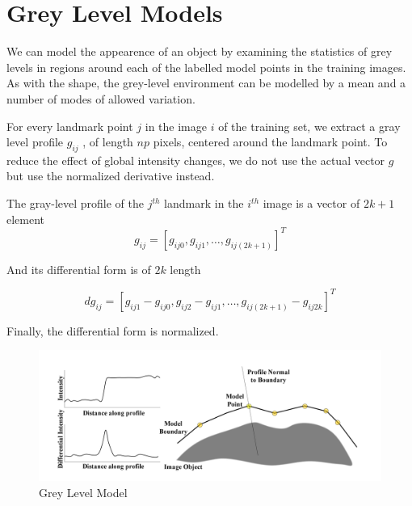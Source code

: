 \section{Grey Level Models}
We can model the appearence of an object by examining
the statistics of grey levels in regions around each
of the labelled model points in the training images.
As with the shape, the grey-level environment can be
modelled by a mean and a number of modes of allowed variation.

For every landmark point $j$ in the image $i$ of the
training set, we extract a gray level profile $g_{ij}$ , of length
$np$ pixels, centered around the landmark point.
To reduce the effect of global intensity changes, we do not use
the actual vector $g$ but use the normalized derivative instead.

The gray-level profile of the $j^{th}$ landmark in the $i^{th}$
image is a vector of $2k+1$ element
$${g_{ij} =  [g_{ij0}, g_{ij1}, \ldots, g_{ij(2k+1)}]}^T$$

And its differential form is of $2k$ length

$$ {dg_{ij} =  [g_{ij1} - g_{ij0}, g_{ij2} - g_{ij1}, \ldots, g_{ij(2k+1)}  - g_{ij 2k}]}^T$$

Finally, the differential form is normalized.

\begin{figure}
  \centering
  \includegraphics[width=\linewidth]{img/grey-level}
  \caption{Grey Level Model}
\end{figure}
